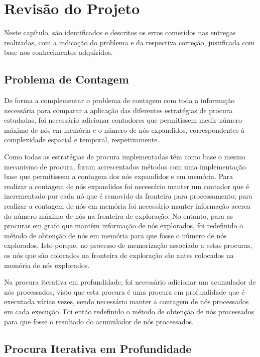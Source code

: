 \chapter{Revisão do Projeto}\label{ch:revisao-projeto}

Neste capítulo, são identificados e descritos os erros cometidos nas entregas realizadas, com a indicação do problema e da respectiva correção, justificada com base nos conhecimentos adquiridos.

\section{Problema de Contagem}\label{sec:problema-de-contagem}

De forma a complementar o problema de contagem com toda a informação necessária para comparar a aplicação das diferentes estratégias de procura estudadas, foi necessário adicionar contadores que permitissem medir número máximo de nós em memória e o número de nós expandidos, correspondentes à complexidade espacial e temporal, respetivamente.

Como todas as estratégias de procura implementadas têm como base o mesmo mecanismo de procura, foram acrescentados métodos com uma implementação base que permitissem a contagem dos nós expandidos e em memória.
Para realizar a contagem de nós expandidos foi necessário manter um contador que é incrementado por cada nó que é removido da fronteira para processamento; para realizar a contagem de nós em memória foi necessário manter informação acerca do número máximo de nós na fronteira de exploração.
No entanto, para as procuras em grafo que mantêm informação de nós explorados, foi redefinido o método de obtenção de nós em memória para que fosse o número de nós explorados.
Isto porque, no processo de memorização associado a estas procuras, os nós que são colocados na fronteira de exploração são antes colocados na memória de nós explorados.

Na procura iterativa em profundidade, foi necessário adicionar um acumulador de nós processados, visto que esta procura é uma procura em profundidade que é executada várias vezes, sendo necessário manter a contagem de nós processados em cada execução.
Foi então redefinido o método de obtenção de nós processados para que fosse o resultado do acumulador de nós processados.

\section{Procura Iterativa em Profundidade}\label{sec:procura-iterativa-em-profundidade}

